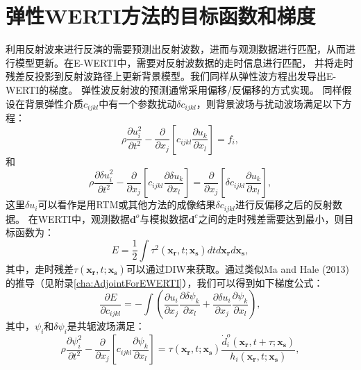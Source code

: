 \section{弹性WERTI方法的目标函数和梯度}
利用反射波来进行反演的需要预测出反射波数，进而与观测数据进行匹配，从而进行模型更新。在E-WERTI中，需要对反射波数据的走时信息进行匹配，
并将走时残差反投影到反射波路径上更新背景模型。我们同样从弹性波方程出发导出E-WERTI的梯度。
弹性波反射波的预测通常采用偏移/反偏移的方式实现。
同样假设在背景弹性介质$c_{ijkl}$中有一个参数扰动$\delta c_{ijkl}$，则背景波场与扰动波场满足以下方程：
\begin{equation}
    \rho \frac{\partial u^2_i}{\partial t^2}  -
    \frac{\partial}{\partial x_j}\left[ 
        c_{ijkl}\frac{\partial u_{k}}{\partial
        x_l}\right]=f_i,
    \label{eq:WE} 
\end{equation}
和
\begin{equation}
    \rho \frac{\partial \delta u^2_i}{\partial t^2}  -
    \frac{\partial}{\partial x_j}\left[ 
        c_{ijkl}\frac{\partial \delta u_{k}}{\partial
        x_l}\right]=\frac{\partial}{\partial x_j}\left[\delta c_{ijkl}\frac{\partial u_{k}}{\partial x_l}\right],
    \label{eq:DeltaWE} 
\end{equation}
这里$\delta u_i$可以看作是用RTM或其他方法的成像结果$\delta c_{ijkl}$进行反偏移之后的反射数据。
在WERTI中，观测数据$\mathbf{d}^{o}$与模拟数据$\mathbf{d}^{c}$之间的走时残差需要达到最小，则目标函数为：
\begin{equation}
    E=\frac{1}{2}\int\tau^2(\mathbf{x_r},t;\mathbf{x_s})dtd\mathbf{x_r}d\mathbf{x_s},
    \label{eq:Objectivefunction} 
\end{equation}
其中，走时残差$\tau(\mathbf{x_r},t;\mathbf{x_s})$可以通过DIW来获取。通过类似Ma and
Hale (2013)\cite{ma2013}的推导（见附录\ref{cha:AdjointForEWERTI}），我们可以得到如下梯度公式：
\begin{equation}
    \frac{\partial E}{\partial c_{ijkl}}=-\int (\frac{\partial u_{i}}{\partial
    x_j}\frac{\partial \delta \psi_{k}}{\partial x_l}+\frac{\partial \delta u_{i}}{\partial
    x_j}\frac{\partial \psi_{k}}{\partial x_l}),
    \label{eq:GradientCijkl}
\end{equation}
其中，$\psi_i$和$\delta \psi_i$是共轭波场满足：
\begin{equation}
    \rho \frac{\partial \psi^2_i}{\partial t^2}  -
    \frac{\partial}{\partial x_j}\left[ 
        c_{ijkl}\frac{\partial \psi_{k}}{\partial
        x_l}\right]=\tau(\mathbf{x_r},t;\mathbf{x_s})\frac{\dot{d}^o_i(\mathbf{x_r},t+\tau;\mathbf{x_s})}{h_i(\mathbf{x_r},t;\mathbf{x_s})},
    \label{eq:AdjointWE} 
\end{equation}
